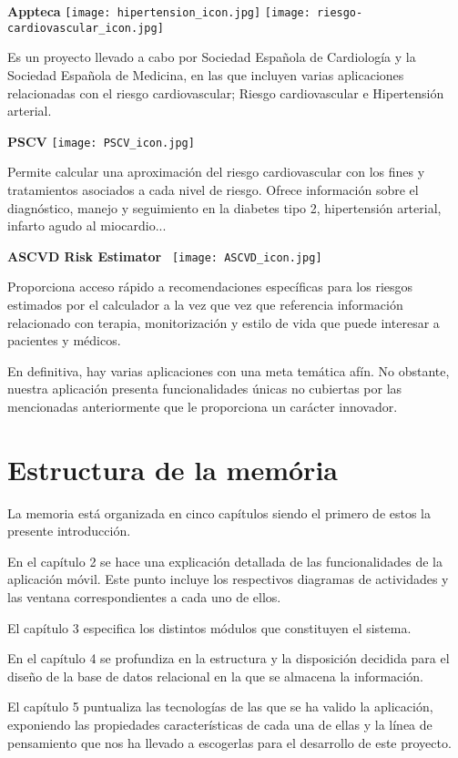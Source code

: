 \documentclass[11pt,spanish,
		listoftables,listoffigures]
		{tfgplantilla}
\begin{document}
\noindent
\textbf {Appteca }
\texttt{[image: hipertension\_icon.jpg]}
\texttt{[image: riesgo-cardiovascular\_icon.jpg]}  

\noindent
Es un  proyecto llevado a cabo por Sociedad Española de Cardiología y la Sociedad Española de Medicina, en las que incluyen varias aplicaciones relacionadas con el riesgo cardiovascular; Riesgo cardiovascular e Hipertensión arterial.

\noindent
\textbf {PSCV}
\texttt{[image: PSCV\_icon.jpg]}

\noindent
Permite calcular una aproximación del riesgo cardiovascular con los fines y tratamientos asociados a cada nivel de riesgo. Ofrece información sobre el diagnóstico, manejo y seguimiento en la diabetes tipo 2, hipertensión arterial, infarto agudo al miocardio...

\noindent
\textbf {ASCVD Risk Estimator}
\ \texttt{[image: ASCVD\_icon.jpg]}

\noindent
Proporciona acceso rápido a recomendaciones específicas para los riesgos estimados por el calculador a la vez que vez que referencia información relacionado con terapia, monitorización y estilo de vida que puede interesar a pacientes y médicos.

En definitiva, hay varias aplicaciones con una meta temática afín. No obstante, nuestra aplicación presenta funcionalidades únicas no cubiertas por las mencionadas anteriormente que le proporciona un carácter innovador. 

\section{Estructura de la mem\'oria}

La memoria está organizada en cinco capítulos siendo el primero de estos la presente introducción.

En el capítulo 2 se hace una explicación detallada de las funcionalidades de la aplicación móvil. Este punto incluye los respectivos diagramas de actividades y las ventana correspondientes a cada uno de ellos.

El capítulo 3 especifica los distintos módulos que constituyen el sistema. 

En el capítulo 4 se profundiza en la estructura y la disposición decidida para el diseño de la base de datos relacional en la que se almacena la información.

El capítulo 5 puntualiza las tecnologías de las que se ha valido la aplicación, exponiendo las propiedades características de cada una de ellas y la línea de pensamiento que nos ha llevado a escogerlas para el desarrollo de este proyecto.
\end{document}
